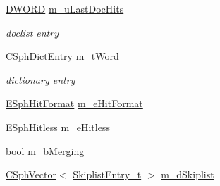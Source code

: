 \begin{DoxyCompactItemize}
\hyperlink{sphinxstd_8h_a798af1e30bc65f319c1a246cecf59e39}{D\-W\-O\-R\-D} \hyperlink{classCSphHitBuilder_a4e7e584c5fab7b09ab72e21fb9b75634}{m\-\_\-u\-Last\-Doc\-Hits}
\begin{DoxyCompactList}\small\item\em doclist entry \end{DoxyCompactList}\item 
\hyperlink{structCSphDictEntry}{C\-Sph\-Dict\-Entry} \hyperlink{classCSphHitBuilder_ac62cd2193a0160da84318f5b2ad3cc34}{m\-\_\-t\-Word}
\begin{DoxyCompactList}\small\item\em dictionary entry \end{DoxyCompactList}\item 
\hyperlink{sphinx_8h_a82ffff53ad1eb4da2ba352fcd9b2626c}{E\-Sph\-Hit\-Format} \hyperlink{classCSphHitBuilder_aa52ef81ce6ba97726bb62ebba78092af}{m\-\_\-e\-Hit\-Format}
\item 
\hyperlink{sphinx_8h_a1920852c5151009d65cf2bc8204a685b}{E\-Sph\-Hitless} \hyperlink{classCSphHitBuilder_afd80c22b913c3ea9baeae07c61ad00a5}{m\-\_\-e\-Hitless}
\item 
bool \hyperlink{classCSphHitBuilder_ad5f96dc66efde0b7ea48afd219f94f74}{m\-\_\-b\-Merging}
\item 
\hyperlink{classCSphVector}{C\-Sph\-Vector}$<$ \hyperlink{structSkiplistEntry__t}{Skiplist\-Entry\-\_\-t} $>$ \hyperlink{classCSphHitBuilder_a4207caaa773f50263a35ff104e2a8c3f}{m\-\_\-d\-Skiplist}
\end{DoxyCompactItemize}



